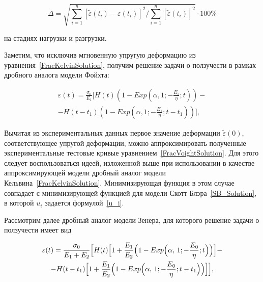 \documentclass[11pt,a4paper,twoside]{article}
\begin{document}
\begin{equation}\label{norma}


\Delta=\sqrt{\displaystyle\sum^{n}_{i=1}\left[\tilde{\varepsilon}(t_{i})-\varepsilon(t_{i})\right]^{2}/\displaystyle\sum^{n}_{i=1}\left[\tilde{\varepsilon}(t_{i})\right]^{2}}\cdot 100\%


\end{equation}  


на стадиях нагрузки и разгрузки. 





Заметим, что исключив мгновенную упругую деформацию из уравнения~\eqref{FracKelvinSolution}, получим решение задачи о ползучести в рамках дробного аналога модели Фойхта:


\begin{multline}


\label{FracVoightSolution}


\varepsilon(t)=\frac{\sigma_{0}}{E_{1}}[H(t)(1-Exp(\alpha,1;-\frac{E_{1}}{\eta};t))-\\-H(t-t_{1})(1-Exp(\alpha,1;-\frac{E_{1}}{\eta};t-t_{1}))],


\end{multline}


Вычитая из экспериментальных данных первое значение деформации $\tilde{\varepsilon}(0)$, соответствующее упругой деформации, можно аппроксимировать полученные экспериментальные тестовые кривые уравнением~\eqref{FracVoightSolution}. Для этого следует воспользоваться идеей, изложенной выше при использовании в качестве аппроксимирующей модели дробный аналог модели Кельвина~\eqref{FracKelvinSolution}. Минимизирующая функция в этом случае совпадает с минимизирующей функцией для модели Скотт Блэра~\eqref{SB_Solution}, в которой $u_{i}$ задается формулой~\eqref{u_i}. 





Рассмотрим далее дробный аналог модели Зенера, для которого решение задачи о ползучести имеет вид~\cite{OgoRadUng16}


\begin{multline}


\label{FracZenerSolution}


\varepsilon(t)=\frac{\sigma_{0}}{E_{1}+E_{2}}\Bigl[H(t)\Bigl[1+\frac{E_{1}}{E_{2}}\Bigl(1-Exp\Bigl(\alpha,\,1;-\frac{E_{0}}{\eta};t\Bigl)\Bigr)\Bigr]-\\


-H(t-t_{1})\Bigl[1+\frac{E_{1}}{E_{2}}\Bigr(1-Exp\Bigl(\alpha,\,1;-\frac{E_{0}}{\eta};t-t_{1}\Bigl)\Bigr)\Bigr]\Bigr],


\end{multline}  
\end{document}
